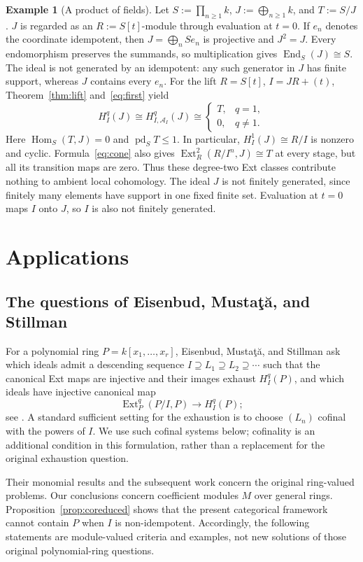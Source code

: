 \documentclass[11pt,reqno]{amsart}
\theoremstyle{definition}
\newtheorem{example}[theorem]{Example}
\theoremstyle{remark}
\newcommand{\Hom}{\operatorname{Hom}}
\newcommand{\Ext}{\operatorname{Ext}}
\newcommand{\A}{\mathcal A_I}
\begin{document}
\begin{example}[A product of fields]\label{ex:product}
Let $S:=\prod_{n\geq1}k$, $J:=\bigoplus_{n\geq1}k$, and $T:=S/J$. \(J\) is regarded as an \(R:=S[t]\)-module through evaluation at \(t=0\). If $e_n$ denotes the coordinate idempotent, then $J=\bigoplus_n Se_n$ is projective and $J^2=J$. Every endomorphism preserves the summands, so multiplication gives $\operatorname{End}_S(J)\cong S$. The ideal is not generated by an idempotent: any such generator in $J$ has finite support, whereas $J$ contains every $e_n$.
For the lift $R=S[t]$, $I=JR+(t)$, Theorem~\ref{thm:lift} and~\eqref{eq:first} yield
\[
H_I^q(J)\cong H_{I,\A}^q(J)\cong
\begin{cases}T,&q=1,\\0,&q\ne1.\end{cases}
\]
Here $\Hom_S(T,J)=0$ and $\operatorname{pd}_S T\leq1$. In particular, $H_I^1(J)\cong R/I$ is nonzero and cyclic. Formula~\eqref{eq:cone} also gives $\Ext_R^2(R/I^n,J)\cong T$ at every stage, but all its transition maps are zero. Thus these degree-two Ext classes contribute nothing to ambient local cohomology. The ideal $J$ is not finitely generated, since finitely many elements have support in one fixed finite set. Evaluation at $t=0$ maps $I$ onto $J$, so $I$ is also not finitely generated.
\end{example}
\section{Applications}\label{sec:applications}
\subsection{The questions of Eisenbud, Musta\c{t}\u{a}, and Stillman}
For a polynomial ring $P=k[x_1,\ldots,x_r]$, Eisenbud, Musta\c{t}\u{a}, and Stillman ask which ideals admit a descending sequence $I\supseteq L_1\supseteq L_2\supseteq\cdots$ such that the canonical Ext maps are injective and their images exhaust $H_I^q(P)$, and which ideals have injective canonical map
\[
\Ext_P^q(P/I,P)\longrightarrow H_I^q(P);
\]
see \cite[Questions~6.1 and~6.2]{EisenbudMustataStillman2000}. A standard sufficient setting for the exhaustion is to choose $(L_n)$ cofinal with the powers of $I$. We use such cofinal systems below; cofinality is an additional condition in this formulation, rather than a replacement for the original exhaustion question.

Their monomial results and the subsequent work \cite{MaSchwedeShimomoto2017,SinghWalther2007} concern the original ring-valued problems. Our conclusions concern coefficient modules $M$ over general rings. Proposition~\ref{prop:coreduced} shows that the present categorical framework cannot contain $P$ when $I$ is non-idempotent. Accordingly, the following statements are module-valued criteria and examples, not new solutions of those original polynomial-ring questions.
\end{document}
